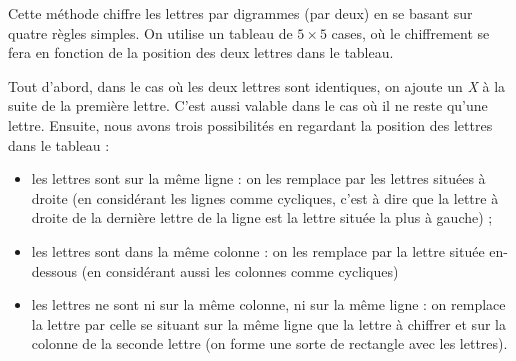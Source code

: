Cette méthode chiffre les lettres par digrammes (par deux) en se
basant sur quatre règles simples. On utilise un tableau de $5
\times 5$ cases,
où le chiffrement se fera en fonction de la position des deux lettres
dans le tableau.  

Tout d'abord, dans le cas où les deux lettres sont
identiques, on ajoute un \emph{X} à la suite de la première
lettre. C'est aussi valable dans le cas où il ne reste qu'une lettre.
Ensuite, nous avons trois possibilités en regardant la position des
lettres dans le tableau : 
\begin{itemize}
  \item les lettres sont sur la même ligne : on les remplace par les
    lettres situées à droite (en considérant les lignes comme
    cycliques, c'est à dire que la lettre à droite de la dernière
    lettre de la ligne est la lettre située la plus à gauche) ; 
  \item les lettres sont dans la même colonne : on les remplace par la
    lettre située en-dessous (en considérant aussi les colonnes comme
    cycliques)
  \item les lettres ne sont ni sur la même colonne, ni sur la même
    ligne : on remplace la lettre par celle se situant sur la même
    ligne que la lettre à chiffrer et sur la colonne de la seconde
    lettre (on forme une sorte de rectangle avec les lettres).
\end{itemize}

